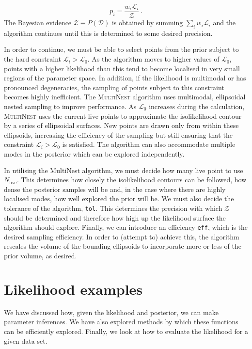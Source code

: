 \begin{equation}
p_i = \frac{w_i \mathcal{L}_i}{\mathcal{Z}}\,.
\end{equation}
The Bayesian evidence $\mathcal{Z} \equiv P(\mathcal{D})$ is obtained by summing $\sum_i w_i \mathcal{L}_i$ and the algorithm continues until this is determined to some desired precision.

In order to continue, we must be able to select points from the prior subject to the hard constraint $\mathcal{L}_i > \mathcal{L}_0$. As the algorithm moves to higher values of $\mathcal{L}_0$, points with a higher likelihood than this tend to become localised in very small regions of the parameter space. In addition, if the likelihood is multimodal or has pronounced degeneracies, the sampling of points subject to this constraint becomes highly inefficient. The \textsc{MultiNest} algorithm \cite{Feroz:2007,Feroz:2008,Feroz:2014} uses multimodal, ellipsoidal nested sampling to improve performance. As $\mathcal{L}_0$ increases during the calculation,  \textsc{MultiNest} uses the current live points to approximate the isolikelihood contour by a series of ellipsoidal surfaces. New points are drawn only from within these ellipsoids, increasing the efficiency of the sampling but still ensuring that the constraint $\mathcal{L}_i > \mathcal{L}_0$ is satisfied. The algorithm can also accommodate multiple modes in the posterior which can be explored independently.

In utilising the MultiNest algorithm, we must decide how many live point to use $N_\textrm{live}$. This determines how closely the isolikelihood contours can be followed, how dense the posterior samples will be and, in the case where there are highly localised modes, how well explored the prior will be. We must also decide the tolerance of the algorithm, \texttt{tol}. This determines the precision with which $\mathcal{Z}$ should be determined and therefore how high up the likelihood surface the algorithm should explore. Finally, we can introduce an efficiency \texttt{eff}, which is the desired sampling efficiency. In order to (attempt to) achieve this, the algorithm rescales the volume of the bounding ellipsoids to incorporate more or less of the prior volume, as desired.

\section{Likelihood examples}

We have discussed how, given the likelihood and posterior, we can make parameter inferences. We have also explored methods by which these functions can be efficiently explored. Finally, we look at how to evaluate the likelihood for a given data set.

